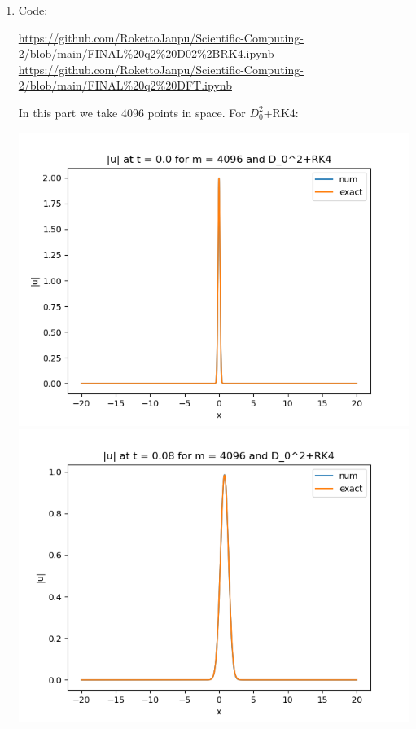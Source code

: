 \documentclass{article}
\begin{document}
\begin{enumerate}[label=(\alph*)]
	
\item 

Code:

\url{https://github.com/RokettoJanpu/Scientific-Computing-2/blob/main/FINAL%20q2%20D02%2BRK4.ipynb}
\url{https://github.com/RokettoJanpu/Scientific-Computing-2/blob/main/FINAL%20q2%20DFT.ipynb}

In this part we take 4096 points in space. For $D_0^2$+RK4:
\begin{center}
	\includegraphics[scale=.3]{FINAL u_abs t = 0.0 m = 4096 D02+RK4}
	\includegraphics[scale=.3]{FINAL u_abs t = 0.08 m = 4096 D02+RK4}

\end{center}
\end{enumerate}
\end{document}
